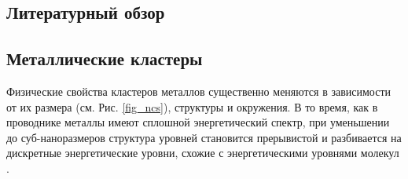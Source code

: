 \documentclass[a4paper,12pt]{article}
\newcommand{\ths}{\thinspace}
\begin{document}
\begin{onehalfspace}
%
%
%	

	
	\newpage
	
	\section*{Литературный обзор}
	
	\subsection*{Металлические кластеры}
	
	Физические свойства кластеров металлов существенно меняются в зависимости от их размера (см. Рис. \ref{fig_ncs}), структуры и окружения. В то время, как в проводнике металлы имеют сплошной энергетический спектр, при уменьшении до суб-наноразмеров структура уровней становится прерывистой и разбивается на дискретные энергетические уровни, схожие с энергетическими уровнями молекул \cite{Baghdasaryan2021}.
	

\end{onehalfspace}
\end{document}
